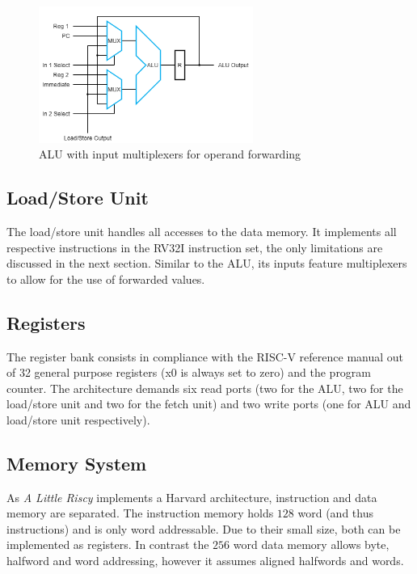 \documentclass[conference]{IEEEtran}
\begin{document}
\begin{figure}
	\centering
	\includegraphics[width=7cm]{alu_mux.png}
	\caption{ALU with input multiplexers for operand forwarding}
	\label{fig:alu}
\end{figure}

\subsection{Load/Store Unit} \label{sec:load_store}
The load/store unit handles all accesses to the data memory. It implements all respective instructions in the RV32I instruction set, the only limitations are discussed in the next section. Similar to the ALU, its inputs feature multiplexers to allow for the use of forwarded values.

\subsection{Registers} \label{sec:registers}
The register bank consists in compliance with the RISC-V reference manual out of 32 general purpose registers (x0 is always set to zero) and the program counter. The architecture demands six read ports (two for the ALU, two for the load/store unit and two for the fetch unit) and two write ports (one for ALU and load/store unit respectively).

\subsection{Memory System} \label{sec:memory}
As \emph{A Little Riscy} implements a Harvard architecture, instruction and data memory are separated. The instruction memory holds $128$ word (and thus instructions) and is only word addressable. Due to their small size, both can be implemented as registers. In contrast the $256$ word data memory allows byte, halfword and word addressing, however it assumes aligned halfwords and words.
\end{document}
